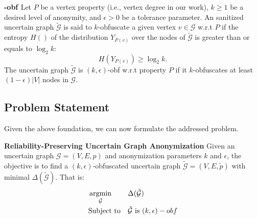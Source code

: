 \theoremstyle{definition}
\begin{definition}
	\textbf{-obf \cite{Boldi_Injecting_2012}}
    Let $P$ be a vertex property (i.e., vertex degree in our work), $k \geq 1$ be a desired level of anonymity, and $\epsilon >0 $ be a tolerance parameter. 
    An sanitized uncertain graph $\tilde{\mathcal{G}}$ is said to $k$-obfuscate a given vertex $v \in \mathcal{G}$ w.r.t $P$ if the entropy $H()$ of the distribution $Y_{P(v)}$ over the nodes 
    of $\tilde{\mathcal{G}}$ is greater than or equals to $\log_{2}{k}$:
    \begin{equation*}
        H(Y_{P(v)}) \geq \log_{2}{k}.
    \label{obfCon}
    \end{equation*}
The uncertain graph $\tilde{\mathcal{G}}$
is $(k,\epsilon)$-obf w.r.t property $P$ 
if it $k$-obfuscates at least $(1-\epsilon)|V|$ nodes in $\mathcal{G}$. 
\label{def:obf}
\end{definition} 

\subsection{Problem Statement}
Given the above foundation, we can now formulate the addressed problem.  
\begin{problem}
	\textbf{Reliability-Preserving Uncertain Graph Anonymization}
     Given an uncertain graph $\mathcal{G}=(V,E,\mathit{p})$ and anonymization parameters $k$ and $\epsilon$, 
     the objective is to find a  $(k,\epsilon)$-obfuscated uncertain graph $\tilde{\mathcal{G}}=(V,E,\tilde{\mathit{p}})$ 
     with minimal  $\Delta(\tilde{\mathcal{G}})$. That is:
     \begin{equation*}
             \begin{aligned}
                 & \argmin_{\tilde{
                \mathcal{G}}} & & \Delta(\tilde{\mathcal{G}}) \\
                &  \text{Subject to} & &\tilde{\mathcal{G}} \text{~is~} (k,\epsilon)-obf
            \end{aligned}
     \end{equation*}
     \label{prob:unobf}
\end{problem}